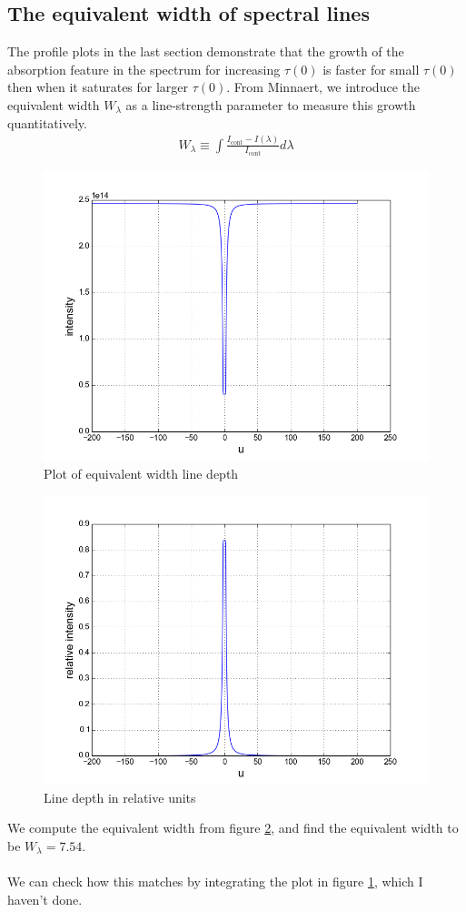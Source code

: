 \documentclass{article}
\begin{document}
\subsection{The equivalent width of spectral lines}
The profile plots in the last section demonstrate that the growth of the absorption feature in the spectrum for increasing $\tau(0)$ is faster for small $\tau(0)$ then when it saturates for larger $\tau(0)$. From Minnaert, we introduce the equivalent width $W_{\lambda}$ as a line-strength parameter to measure this growth quantitatively.
\begin{align*}
  W_{\lambda} \equiv \int\frac{I_{\text{cont}}-I(\lambda)}{I_{\text{cont}}}d\lambda
\end{align*}
\begin{figure}[H]
  \centering
  \includegraphics[scale=0.5]{ssa_3_4_1.png}
  \caption{Plot of equivalent width line depth}
  \label{fig:eqw}
\end{figure}
\begin{figure}[H]
  \centering
  \includegraphics[scale=0.5]{ssa_3_4_2.png}
  \caption{Line depth in relative units}
  \label{fig:rel_width}
\end{figure}
We compute the equivalent width from figure \ref{fig:rel_width}, and find the equivalent width to be $W_{\lambda} = 7.54$.\\\\
We can check how this matches by integrating the plot in figure \ref{fig:eqw}, which I haven't done.
\end{document}
